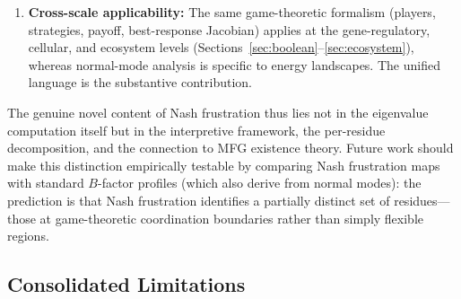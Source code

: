 \documentclass[12pt,a4paper]{article}
\theoremstyle{remark}
\begin{document}
\begin{enumerate}
    \item \textbf{Cross-scale applicability:} The same game-theoretic formalism (players, strategies, payoff, best-response Jacobian) applies at the gene-regulatory, cellular, and ecosystem levels (Sections~\ref{sec:boolean}--\ref{sec:ecosystem}), whereas normal-mode analysis is specific to energy landscapes. The unified language is the substantive contribution.
\end{enumerate}

\noindent The genuine novel content of Nash frustration thus lies not in the eigenvalue computation itself but in the interpretive framework, the per-residue decomposition, and the connection to MFG existence theory. Future work should make this distinction empirically testable by comparing Nash frustration maps with standard $B$-factor profiles (which also derive from normal modes): the prediction is that Nash frustration identifies a partially distinct set of residues---those at game-theoretic coordination boundaries rather than simply flexible regions.

\subsection{Consolidated Limitations}
\end{document}
